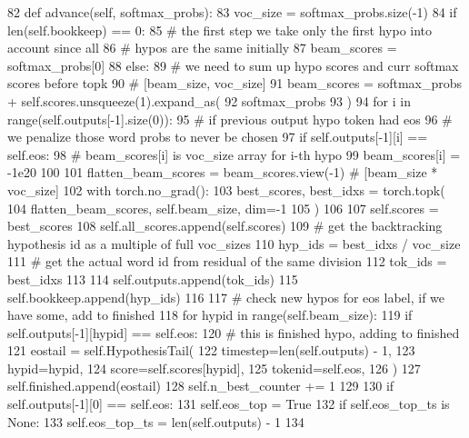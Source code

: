 \begin{DoxyCode}
82     \textcolor{keyword}{def }advance(self, softmax\_probs):
83         voc\_size = softmax\_probs.size(-1)
84         \textcolor{keywordflow}{if} len(self.bookkeep) == 0:
85             \textcolor{comment}{# the first step we take only the first hypo into account since all}
86             \textcolor{comment}{# hypos are the same initially}
87             beam\_scores = softmax\_probs[0]
88         \textcolor{keywordflow}{else}:
89             \textcolor{comment}{# we need to sum up hypo scores and curr softmax scores before topk}
90             \textcolor{comment}{# [beam\_size, voc\_size]}
91             beam\_scores = softmax\_probs + self.scores.unsqueeze(1).expand\_as(
92                 softmax\_probs
93             )
94             \textcolor{keywordflow}{for} i \textcolor{keywordflow}{in} range(self.outputs[-1].size(0)):
95                 \textcolor{comment}{#  if previous output hypo token had eos}
96                 \textcolor{comment}{# we penalize those word probs to never be chosen}
97                 \textcolor{keywordflow}{if} self.outputs[-1][i] == self.eos:
98                     \textcolor{comment}{# beam\_scores[i] is voc\_size array for i-th hypo}
99                     beam\_scores[i] = -1e20
100 
101         flatten\_beam\_scores = beam\_scores.view(-1)  \textcolor{comment}{# [beam\_size * voc\_size]}
102         with torch.no\_grad():
103             best\_scores, best\_idxs = torch.topk(
104                 flatten\_beam\_scores, self.beam\_size, dim=-1
105             )
106 
107         self.scores = best\_scores
108         self.all\_scores.append(self.scores)
109         \textcolor{comment}{# get the backtracking hypothesis id as a multiple of full voc\_sizes}
110         hyp\_ids = best\_idxs / voc\_size
111         \textcolor{comment}{# get the actual word id from residual of the same division}
112         tok\_ids = best\_idxs %
113 
114         self.outputs.append(tok\_ids)
115         self.bookkeep.append(hyp\_ids)
116 
117         \textcolor{comment}{#  check new hypos for eos label, if we have some, add to finished}
118         \textcolor{keywordflow}{for} hypid \textcolor{keywordflow}{in} range(self.beam\_size):
119             \textcolor{keywordflow}{if} self.outputs[-1][hypid] == self.eos:
120                 \textcolor{comment}{#  this is finished hypo, adding to finished}
121                 eostail = self.HypothesisTail(
122                     timestep=len(self.outputs) - 1,
123                     hypid=hypid,
124                     score=self.scores[hypid],
125                     tokenid=self.eos,
126                 )
127                 self.finished.append(eostail)
128                 self.n\_best\_counter += 1
129 
130         \textcolor{keywordflow}{if} self.outputs[-1][0] == self.eos:
131             self.eos\_top = \textcolor{keyword}{True}
132             \textcolor{keywordflow}{if} self.eos\_top\_ts \textcolor{keywordflow}{is} \textcolor{keywordtype}{None}:
133                 self.eos\_top\_ts = len(self.outputs) - 1
134 
\end{DoxyCode}
